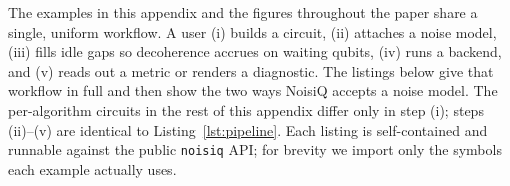 \documentclass[10pt,twocolumn]{article}
\begin{document}
The examples in this appendix and the figures throughout the paper share a
single, uniform workflow. A user (i) builds a circuit, (ii) attaches a noise
model, (iii) fills idle gaps so decoherence accrues on waiting qubits, (iv)
runs a backend, and (v) reads out a metric or renders a diagnostic. The
listings below give that workflow in full and then show the two ways NoisiQ
accepts a noise model. The per-algorithm circuits in the rest of this appendix
differ only in step (i); steps (ii)--(v) are identical to
Listing~\ref{lst:pipeline}. Each listing is self-contained and runnable against
the public \texttt{noisiq} API; for brevity we import only the symbols each
example actually uses.
 
\end{document}

